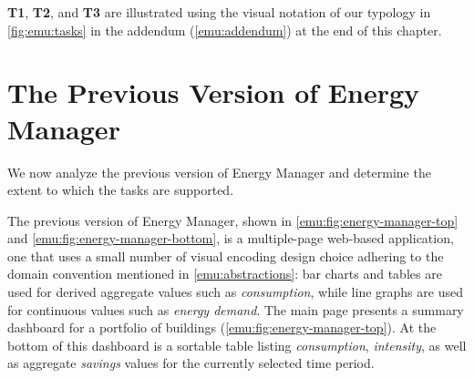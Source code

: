 {\bf T1}, {\bf T2}, and {\bf T3} are illustrated using the visual notation of our typology in \autoref{fig:emu:tasks} in the addendum (\autoref{emu:addendum}) at the end of this chapter.


\section{The Previous Version of Energy Manager}
\label{emu:existing-tool}


We now analyze the previous version of Energy Manager and determine the extent to which the tasks are supported.

The previous version of Energy Manager, shown in \autoref{emu:fig:energy-manager-top} and \autoref{emu:fig:energy-manager-bottom}, is a multiple-page web-based application, one that uses a small number of visual encoding design choice adhering to the domain convention mentioned in \autoref{emu:abstractions}: bar charts and tables are used for derived aggregate values such as {\it consumption}, while line graphs are used for continuous values such as {\it energy demand}.
The main page presents a summary dashboard for a portfolio of buildings (\autoref{emu:fig:energy-manager-top}). 
At the bottom of this dashboard is a sortable table listing {\it consumption}, {\it intensity}, as well as aggregate {\it savings} values for the currently selected time period. 


